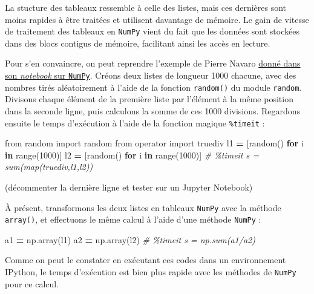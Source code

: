 \documentclass[
  12pt,
]{book}
\newenvironment{Shaded}{\begin{snugshade}}{\end{snugshade}}
\newcommand{\BuiltInTok}[1]{#1}
\newcommand{\CommentTok}[1]{\textcolor[rgb]{0.56,0.35,0.01}{\textit{#1}}}
\newcommand{\ControlFlowTok}[1]{\textcolor[rgb]{0.13,0.29,0.53}{\textbf{#1}}}
\newcommand{\DecValTok}[1]{\textcolor[rgb]{0.00,0.00,0.81}{#1}}
\newcommand{\ImportTok}[1]{#1}
\newcommand{\KeywordTok}[1]{\textcolor[rgb]{0.13,0.29,0.53}{\textbf{#1}}}
\newcommand{\NormalTok}[1]{#1}
\newcommand{\OperatorTok}[1]{\textcolor[rgb]{0.81,0.36,0.00}{\textbf{#1}}}
\numberwithin{equation}{section}
\numberwithin{countremarque}{section}
\begin{document}
La stucture des tableaux ressemble à celle des listes, mais ces dernières sont moins rapides à être traitées et utilisent davantage de mémoire. Le gain de vitesse de traitement des tableaux en \texttt{NumPy} vient du fait que les données sont stockées dans des blocs contigus de mémoire, facilitant ainsi les accès en lecture.

Pour s'en convaincre, on peut reprendre l'exemple de Pierre Navaro \href{https://github.com/pnavaro/python-notebooks/blob/master/13.Numpy.ipynb}{donné dans son \emph{notebook} sur \texttt{NumPy}}. Créons deux listes de longueur 1000 chacune, avec des nombres tirés aléatoirement à l'aide de la fonction \texttt{random()} du module \texttt{random}. Divisons chaque élément de la première liste par l'élément à la même position dans la seconde ligne, puis calculons la somme de ces 1000 divisions. Regardons ensuite le temps d'exécution à l'aide de la fonction magique \texttt{\%timeit} :

\begin{Shaded}
\begin{Highlighting}[]
\ImportTok{from}\NormalTok{ random }\ImportTok{import}\NormalTok{ random}
\ImportTok{from}\NormalTok{ operator }\ImportTok{import}\NormalTok{ truediv}
\NormalTok{l1 }\OperatorTok{=}\NormalTok{ [random() }\ControlFlowTok{for}\NormalTok{ i }\KeywordTok{in} \BuiltInTok{range}\NormalTok{(}\DecValTok{1000}\NormalTok{)]}
\NormalTok{l2 }\OperatorTok{=}\NormalTok{ [random() }\ControlFlowTok{for}\NormalTok{ i }\KeywordTok{in} \BuiltInTok{range}\NormalTok{(}\DecValTok{1000}\NormalTok{)]}
\CommentTok{\# \%timeit s = sum(map(truediv,l1,l2))}
\end{Highlighting}
\end{Shaded}

(décommenter la dernière ligne et tester sur un Jupyter Notebook)

À présent, transformons les deux listes en tableaux \texttt{NumPy} avec la méthode \texttt{array()}, et effectuons le même calcul à l'aide d'une méthode \texttt{NumPy} :

\begin{Shaded}
\begin{Highlighting}[]
\NormalTok{a1 }\OperatorTok{=}\NormalTok{ np.array(l1)}
\NormalTok{a2 }\OperatorTok{=}\NormalTok{ np.array(l2)}
\CommentTok{\# \%timeit s = np.sum(a1/a2)}
\end{Highlighting}
\end{Shaded}

Comme on peut le constater en exécutant ces codes dans un environnement IPython, le temps d'exécution est bien plus rapide avec les méthodes de \texttt{NumPy} pour ce calcul.
\end{document}
